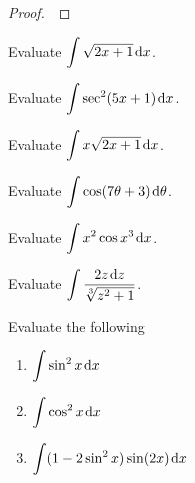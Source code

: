 \begin{proof}\,

\vspace{5.5in}
\end{proof}

\newpage

\begin{example}
Evaluate $\displaystyle\int \sqrt{2x+1}\mkern 2mu \mathrm{d} x$.
\end{example}

\vfill

\begin{example}
Evaluate $\displaystyle\int \sec^2(5x+1)\mkern 2mu \mathrm{d} x$.
\end{example}

\vfill

\newpage

\begin{example}
Evaluate $\displaystyle\int x\sqrt{2x+1}\mkern 2mu \mathrm{d} x$.
\end{example}

\vfill

\begin{example}
Evaluate $\displaystyle \int\cos(7\theta+3)\mkern 2mu \mathrm{d}\theta$.
\end{example}

\vfill

\newpage

\begin{example}
Evaluate $\displaystyle\int x^2\cos x^3\mkern 2mu \mathrm{d} x$.
\end{example}

\vfill

\begin{example}
Evaluate $\displaystyle\int\frac{2z\mkern 2mu \mathrm{d} z}{\sqrt[3]{z^2+1}}$.
\end{example}

\vfill

\newpage

\begin{example}
Evaluate the following 
\begin{enumerate}[label=(\alph*)]
\item $\displaystyle\int\sin^2 x\mkern 2mu \mathrm{d} x$
\vfill
\item $\displaystyle\int\cos^2 x\mkern 2mu \mathrm{d} x$
\vfill
\item $\displaystyle\int(1-2\sin^2 x)\sin(2x)\mkern 2mu \mathrm{d} x$
\vfill
\end{enumerate}
\end{example}

